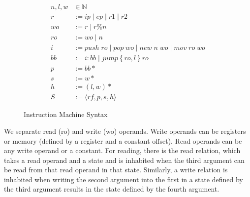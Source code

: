 \begin{figure}
\begin{align}
n, l, w &\in \mathbb{N} \tag{Machine Word} \\
r &:= ip \; | \; ep \; | \; r1 \; | \; r2 \tag{Registers} \\
wo &:= r \; | \; r \% n \tag{Write Operands} \\
ro &:= wo \; | \; n \tag{Read Operands} \\
i &:= \mathit{push} \; ro \; | \; \mathit{pop} \; wo \; | \; \mathit{new} \; n
\; wo \; | \; \mathit{mov} \; ro \; wo \tag{Instructions} \\
bb &:= i : bb \; | \; \mathit{jump} \left\{ro, l\right\} ro \tag{Basic Block} \\
p &:= bb* \tag{Program} \\
s &:= w* \tag{Stack} \\
h &:= \left(l, w\right)* \tag{Heap}\\
S &:= \langle rf, p, s, h \rangle \tag{State} 
\end{align}
\caption{Instruction Machine Syntax}
\label{fig:im_syntax}
\end{figure}

We separate read (ro) and write (wo) operands. Write operands can be registers
or memory (defined by a register and a constant offset). Read operands can be
any write operand or a constant. For reading, there is the read relation, which
takes a read operand and a state and is inhabited when the third argument can be
read from that read operand in that state. Similarly, a write relation is
inhabited when writing the second argument into the first in a state defined by
the third argument results in the state defined by the fourth argument.  

